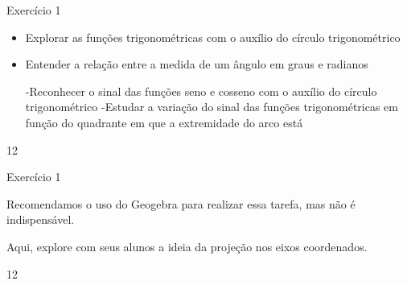 \clearpage
\def\currentcolor{cor1}
\marginpar{\vspace{-.5em}}
\begin{objectives}{Exercício 1}
{
\begin{itemize}
\item Explorar as funções trigonométricas com o auxílio do círculo
trigonométrico
\item Entender a relação entre a medida de um ângulo em graus e
radianos

-Reconhecer o sinal das funções seno e cosseno com o auxílio
do círculo trigonométrico
-Estudar a variação do sinal das funções trigonométricas em
função do quadrante em que a extremidade do arco está
\end{itemize}
}{1}{2}
\end{objectives}
\marginpar{\vspace{-2.5em}}
\begin{sugestions}{Exercício 1}
{
Recomendamos o uso do Geogebra para realizar essa tarefa,
mas não é indispensável.


Aqui, explore com seus alunos a ideia da projeção nos eixos
coordenados.
}{1}{2}
\end{sugestions}
\marginpar{\vspace{-1.75em}}
